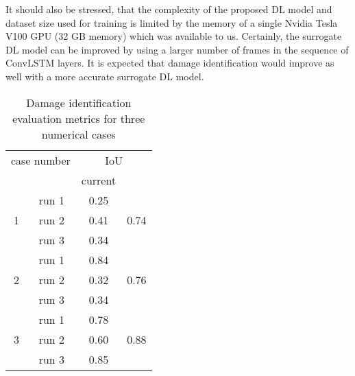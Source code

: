 It should also be stressed, that the complexity of the proposed DL model and dataset size used for training is limited by the memory of a single Nvidia Tesla V100 GPU (32 GB memory) which was available to us.
Certainly, the surrogate DL model can be improved by using a larger number of frames in the sequence of ConvLSTM layers. 
It is expected that damage identification would improve as well with a more accurate surrogate DL model.

\begin{table}[ht]
	\centering
	\caption{Damage identification evaluation metrics for three numerical cases}
	\begin{tabular}{@{}cccc@{}}
		\toprule
		\multicolumn{2}{c}{case number}       & \multicolumn{2}{c}{IoU} \\ 
		\cmidrule(lr){3-4} 
		& & current & \cite{Ullah2023}\\
		\midrule
		\multirow{3}{*}{1} & run 1    & 0.25 & \multirow{3}{*}{0.74}       \\ 
						   & run 2    & 0.41 &        \\ 
						   & run 3    & 0.34 &        \\ 
		\midrule
		\multirow{3}{*}{2} & run 1    & 0.84 & \multirow{3}{*}{0.76}       \\ 
		                   & run 2    & 0.32 &        \\ 
		                   & run 3    & 0.34 &        \\ 
		\midrule
		\multirow{3}{*}{3} & run 1     & 0.78 & \multirow{3}{*}{0.88}       \\ 
		                   & run 2     & 0.60 &        \\ 
		                   & run 3     & 0.85 &        \\ 
		\bottomrule
	\end{tabular}
	\label{tab:iou}
\end{table}